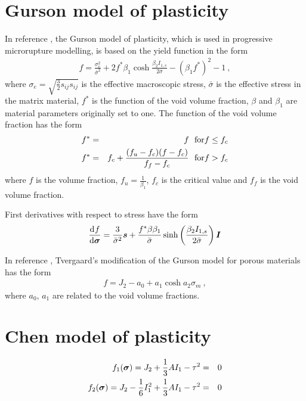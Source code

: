\section{Gurson model of plasticity}

In reference \cite{belytschko:nonlin}, the Gurson model of plasticity,
which is used in progressive microrupture modelling,
is based on the yield function in the form
\begin{eqnarray}
f = \frac{\sigma_e^2}{\bar{\sigma}^2} + 2 f^* \beta_1 \cosh \frac{\beta_2 I_{1,s}}{2\bar{\sigma}} - (\beta_1 f^*)^2 - 1\ ,
\end{eqnarray}
where
$\sigma_e=\sqrt{\frac{3}{2}s_{ij}s_{ij}}$ is the effective macroscopic stress,
$\bar{\sigma}$ is the effective stress in the matrix material,
$f^*$ is the function of the void volume fraction,
$\beta$ and $\beta_1$ are material parameters originally set to one.
The function of the void volume fraction has the form
\begin{eqnarray}
f^* &=& f\ \  {\rm for} f \leq f_c
\\
f^* &=& f_c + \frac{(f_u-f_c)(f-f_c)}{f_f-f_c}\ \  {\rm for} f>f_c
\end{eqnarray}
where
$f$ is the volume fraction,
$f_u=\frac{1}{\beta_1}$,
$f_c$ is the critical value
and $f_f$ is the void volume fraction.

First derivatives with respect to stress have the form
\begin{eqnarray}
\mbox{$\displaystyle\frac{{\rm d}\>\!{f}}{{\rm d}{\mbox{\boldmath$\sigma$}}}$} = \frac{3}{\bar{\sigma}^2} \mbox{\boldmath$s$} + \frac{f^* \beta \beta_1}{\bar{\sigma}} \sinh \left(\frac{\beta_2 I_{1,s}}{2\bar{\sigma}}\right)\mbox{\boldmath$I$} 
\end{eqnarray}

In reference \cite{crisfield2}, Tvergaard's modification of the Gurson model
for porous materials has the form
\begin{eqnarray}
f = J_2 - a_0 + a_1 \cosh a_2 \sigma_m\ ,
\end{eqnarray}
where $a_0$, $a_1$ are related to the void volume fractions.

\section{Chen model of plasticity}
\begin{eqnarray}
f_1 (\mbox{\boldmath$\sigma$}) = J_2 + \mbox{$\displaystyle\frac{1}{3}$} A I_1 - \tau^2 &=& 0 
\\
f_2 (\mbox{\boldmath$\sigma$}) = J_2 -\mbox{$\displaystyle\frac{1}{6}$} I_1^2 + \mbox{$\displaystyle\frac{1}{3}$} A I_1 - \tau^2 &=& 0 
\end{eqnarray}

